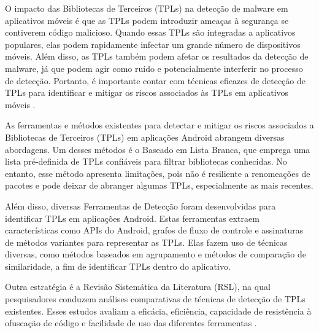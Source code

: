 

O impacto das Bibliotecas de Terceiros (TPLs) na detecção de malware em aplicativos móveis é que as TPLs podem introduzir ameaças à segurança se contiverem código malicioso. Quando essas TPLs são integradas a aplicativos populares, elas podem rapidamente infectar um grande número de dispositivos móveis. Além disso, as TPLs também podem afetar os resultados da detecção de malware, já que podem agir como ruído e potencialmente interferir no processo de detecção. Portanto, é importante contar com técnicas eficazes de detecção de TPLs para identificar e mitigar os riscos associados às TPLs em aplicativos móveis \cite{api_tpl_zhang}.


As ferramentas e métodos existentes para detectar e mitigar os riscos associados a Bibliotecas de Terceiros (TPLs) em aplicações Android abrangem diversas abordagens. Um desses métodos é o Baseado em Lista Branca, que emprega uma lista pré-definida de TPLs confiáveis para filtrar bibliotecas conhecidas. No entanto, esse método apresenta limitações, pois não é resiliente a renomeações de pacotes e pode deixar de abranger algumas TPLs, especialmente as mais recentes.

Além disso, diversas Ferramentas de Detecção foram desenvolvidas para identificar TPLs em aplicações Android. Estas ferramentas extraem características como APIs do Android, grafos de fluxo de controle e assinaturas de métodos variantes para representar as TPLs. Elas fazem uso de técnicas diversas, como métodos baseados em agrupamento e métodos de comparação de similaridade, a fim de identificar TPLs dentro do aplicativo.

Outra estratégia é a Revisão Sistemática da Literatura (RSL), na qual pesquisadores conduzem análises comparativas de técnicas de detecção de TPLs existentes. Esses estudos avaliam a eficácia, eficiência, capacidade de resistência à ofuscação de código e facilidade de uso das diferentes ferramentas \cite{api_tpl_zhang}.

